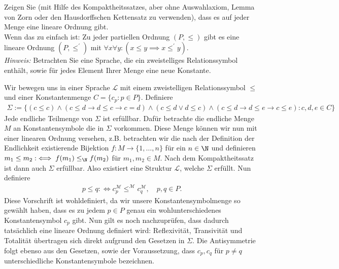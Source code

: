 
\begin{exercise}[133]

Zeigen Sie (mit Hilfe des Kompaktheitssatzes, aber ohne Auswahlaxiom, Lemma von Zorn
oder den Hausdorffschen Kettensatz zu verwenden), dass es auf jeder Menge eine
lineare Ordnung gibt. \\
Wenn das zu einfach ist: Zu jeder partiellen Ordnung $(P,\leq)$ gibt es eine
lineare Ordnung $(P,\leq^{\prime})$ mit $\forall x \forall y: (x \leq y \implies x \leq^{\prime} y)$. \\
\textit{Hinweis:} Betrachten Sie eine Sprache, die ein zweistelliges Relationssymbol
enthält, sowie für jedes Element Ihrer Menge eine neue Konstante.

\end{exercise}


\begin{solution}

Wir bewegen uns in einer Sprache $\mathscr{L}$ mit einem zweistelligen Relationssymbol $\leq$
und einer Konstantenmenge $C = \{c_p: p \in P \}$. Definiere
\begin{align*}
  \Sigma := \{(c \leq c) \land
  (c \leq d \rightarrow d \leq c \rightarrow c = d) \land
  (c \leq d \lor d \leq c) \land
  (c \leq d \rightarrow d \leq e \rightarrow c \leq e): c,d,e \in C\}
\end{align*}
Jede endliche Teilmenge von $\Sigma$ ist erfüllbar. Dafür betrachte die endliche Menge $M$
an Konstantensymbole die in $\Sigma$ vorkommen. Diese Menge können wir nun mit
einer linearen Ordnung versehen, z.B. betrachten wir die nach der Definition der
Endlichkeit existierende Bijektion $f: M \to \{1,\dots,n\}$ für ein $n \in \N$ und
definieren $m_1 \leq m_2:\iff f(m_1) \leq_\N f(m_2)$ für $m_1,m_2 \in M$.
Nach dem Kompaktheitssatz ist dann auch $\Sigma$ erfüllbar.
Also existiert eine Struktur $\mathscr{L}$, welche $\Sigma$ erfüllt. Nun definiere
\begin{align*}
  p \leq q: \iff c_p^{\mathscr{M}} \leq^{\mathscr{M}} c_q^{\mathscr{M}}, \quad p,q \in P.
\end{align*}
Diese Vorschrift ist wohldefiniert, da wir unsere Konstantensymbolmenge so
gewählt haben, dass es zu jedem $p \in P$ genau ein wohlunterschiedenes Konstantensymbol $c_p$ gibt.
Nun gilt es noch nachzuprüfen, dass dadurch tatsächlich eine lineare Ordnung definiert wird:
Reflexivität, Transivität und Totalität übertragen sich direkt aufgrund den Gesetzen in $\Sigma$.
Die Antisymmetrie folgt ebenso aus den Gesetzen, sowie der Voraussetzung, dass $c_p, c_q$
für $p \neq q$ unterschiedliche Konstantensymbole bezeichnen.
\end{solution}

